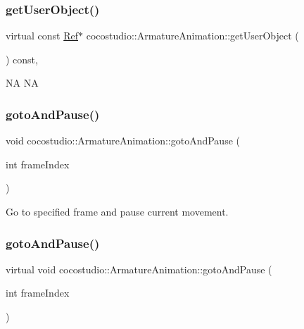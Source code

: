 \subsubsection{\texorpdfstring{get\+User\+Object()}{getUserObject()}\hspace{0.1cm}{\footnotesize\ttfamily [4/4]}}
{\footnotesize\ttfamily virtual const \hyperlink{classRef}{Ref}$\ast$ cocostudio\+::\+Armature\+Animation\+::get\+User\+Object (\begin{DoxyParamCaption}{ }\end{DoxyParamCaption}) const\hspace{0.3cm}{\ttfamily [inline]}, {\ttfamily [virtual]}}

NA  NA \mbox{\label{classcocostudio_1_1ArmatureAnimation_a4d2f36f139143b58a1c25f26751d8318}} 
\subsubsection{\texorpdfstring{goto\+And\+Pause()}{gotoAndPause()}\hspace{0.1cm}{\footnotesize\ttfamily [1/2]}}
{\footnotesize\ttfamily void cocostudio\+::\+Armature\+Animation\+::goto\+And\+Pause (\begin{DoxyParamCaption}\item[{int}]{frame\+Index }\end{DoxyParamCaption})\hspace{0.3cm}{\ttfamily [virtual]}}

Go to specified frame and pause current movement. \mbox{\label{classcocostudio_1_1ArmatureAnimation_aff8187d8018c08e7c62a6dbd1255558f}} 
\subsubsection{\texorpdfstring{goto\+And\+Pause()}{gotoAndPause()}\hspace{0.1cm}{\footnotesize\ttfamily [2/2]}}
{\footnotesize\ttfamily virtual void cocostudio\+::\+Armature\+Animation\+::goto\+And\+Pause (\begin{DoxyParamCaption}\item[{int}]{frame\+Index }\end{DoxyParamCaption})\hspace{0.3cm}{\ttfamily [virtual]}}

